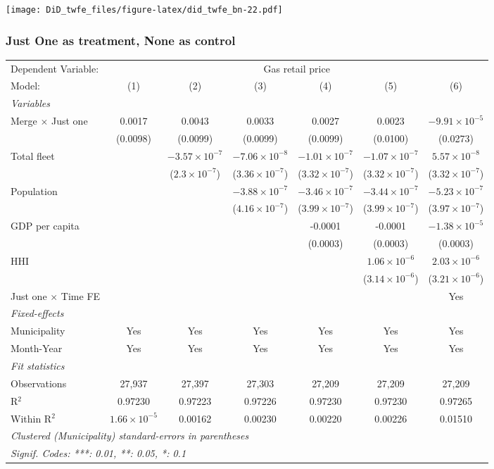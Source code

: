 \documentclass[
]{article}
\begin{document}
\texttt{[image: DiD\_twfe\_files/figure-latex/did\_twfe\_bn-22.pdf]}

\hypertarget{just-one-as-treatment-none-as-control}{%
\subsubsection{Just One as treatment, None as
control}\label{just-one-as-treatment-none-as-control}}

\begin{tabular}{lcccccc}
\tabularnewline\midrule\midrule
Dependent Variable:&\multicolumn{6}{c}{Gas retail price}\\
Model:&(1) & (2) & (3) & (4) & (5) & (6)\\
\midrule \emph{Variables}&   &   &   &   &   &  \\
Merge $\times $ Just one & 0.0017 & 0.0043 & 0.0033 & 0.0027 & 0.0023 & $-9.91\times 10^{-5}$\\
  &(0.0098) & (0.0099) & (0.0099) & (0.0099) & (0.0100) & (0.0273)\\
Total fleet &    & $-3.57\times 10^{-7}$ & $-7.06\times 10^{-8}$ & $-1.01\times 10^{-7}$ & $-1.07\times 10^{-7}$ & $5.57\times 10^{-8}$\\
  &   & ($2.3\times 10^{-7}$) & ($3.36\times 10^{-7}$) & ($3.32\times 10^{-7}$) & ($3.32\times 10^{-7}$) & ($3.32\times 10^{-7}$)\\
Population &    &    & $-3.88\times 10^{-7}$ & $-3.46\times 10^{-7}$ & $-3.44\times 10^{-7}$ & $-5.23\times 10^{-7}$\\
  &   &    & ($4.16\times 10^{-7}$) & ($3.99\times 10^{-7}$) & ($3.99\times 10^{-7}$) & ($3.97\times 10^{-7}$)\\
GDP per capita &    &    &    & -0.0001 & -0.0001 & $-1.38\times 10^{-5}$\\
  &   &    &    & (0.0003) & (0.0003) & (0.0003)\\
HHI &    &    &    &    & $1.06\times 10^{-6}$ & $2.03\times 10^{-6}$\\
  &   &    &    &    & ($3.14\times 10^{-6}$) & ($3.21\times 10^{-6}$)\\
Just one $\times$ Time FE &  &  &  &  &  & Yes\\
\midrule \emph{Fixed-effects}&   &   &   &   &   &  \\
Municipality & Yes & Yes & Yes & Yes & Yes & Yes\\
Month-Year & Yes & Yes & Yes & Yes & Yes & Yes\\
\midrule \emph{Fit statistics}&  & & & & & \\
Observations & 27,937&27,397&27,303&27,209&27,209&27,209\\
R$^2$ & 0.97230&0.97223&0.97226&0.97230&0.97230&0.97265\\
Within R$^2$ & $1.66\times 10^{-5}$&0.00162&0.00230&0.00220&0.00226&0.01510\\
\midrule\midrule\multicolumn{7}{l}{\emph{Clustered (Municipality) standard-errors in parentheses}}\\
\multicolumn{7}{l}{\emph{Signif. Codes: ***: 0.01, **: 0.05, *: 0.1}}\\
\end{tabular}
\end{document}

